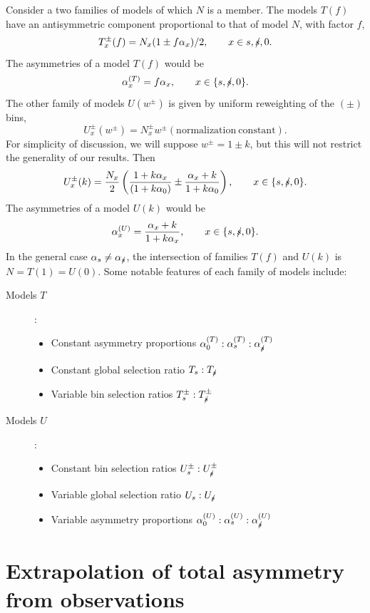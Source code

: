 \documentclass[letterpaper,11pt]{article}
\newcommand{\selected}{{\ensuremath s}}
\newcommand{\unselected}{{\ensuremath\slash\!\!\!\selected}}
\newcommand{\tot}{0}
\begin{document}
Consider a two families of models of which $N$ is a member.  The
models $T(f)$ have an antisymmetric component proportional to that of
model $N$, with factor $f$,
\[T_x^{\pm}(f) = N_x(1\pm f\alpha_x)/2,\qquad x\in{\selected,\unselected,\tot}.\]
The asymmetries of a model $T(f)$ would be
\[\alpha_x^{(T)}=f\alpha_x, \qquad x\in\{\selected,\unselected,\tot\}.\]
The other family of models $U(w^\pm)$ is given by uniform reweighting
of the $(\pm)$ bins,
\[U_x^\pm(w^\pm) = N_x^\pm w^\pm(\mathrm{normalization\ constant}).\]
For simplicity of discussion, we will suppose $w^\pm=1\pm k$, but this
will not restrict the generality of our results.  Then
\[U_x^\pm(k) = \frac{N_x}{2}\left(\frac{1+k\alpha_x}{(1+k\alpha_\tot)}\pm\frac{\alpha_x+k}{1+k\alpha_\tot}\right), \qquad x\in\{\selected,\unselected,\tot\}.\]
The asymmetries of a model $U(k)$ would be
\[\alpha_x^{(U)} = \frac{\alpha_x+k}{1+k\alpha_x}, \qquad x\in\{\selected,\unselected,\tot\}.\]
In the general case $\alpha_\selected\ne\alpha_\unselected$, the
intersection of families $T(f)$ and $U(k)$ is $N=T(1)=U(0)$.  Some
notable features of each family of models include:
\begin{description}
\item[Models $T$]:
  \begin{itemize}
  \item Constant asymmetry proportions $\alpha_\tot^{(T)}:\alpha^{(T)}_\selected:\alpha^{(T)}_\unselected$
  \item Constant global selection ratio $T_\selected:T_\unselected$
  \item Variable bin selection ratios $T^\pm_\selected:T^\pm_\unselected$
  \end{itemize}
\item[Models $U$]:
  \begin{itemize}
  \item Constant bin selection ratios $U^\pm_\selected:U^\pm_\unselected$
  \item Variable global selection ratio $U_\selected:U_\unselected$
  \item Variable asymmetry proportions $\alpha_\tot^{(U)}:\alpha^{(U)}_\selected:\alpha^{(U)}_\unselected$
  \end{itemize}
\end{description}


\section{Extrapolation of total asymmetry from observations}
\end{document}
